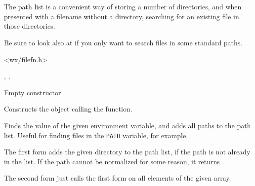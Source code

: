 \section{}\label{wxpathlist}

The path list is a convenient way of storing a number of directories, and
when presented with a filename without a directory, searching for an existing file
in those directories.

Be sure to look also at  if you only
want to search files in some standard paths.




<wx/filefn.h>


, , 



\label{wxpathlistctor}


Empty constructor.


Constructs the object calling the  function.


\label{wxpathlistaddenvlist}


Finds the value of the given environment variable, and adds all paths
to the path list. Useful for finding files in the {\tt PATH} variable, for
example.


\label{wxpathlistadd}



The first form adds the given directory to the path list, if the path is not already in the list.
If the path cannot be normalized for some reason, it returns \false.

The second form just calls the first form on all elements of the given array.

